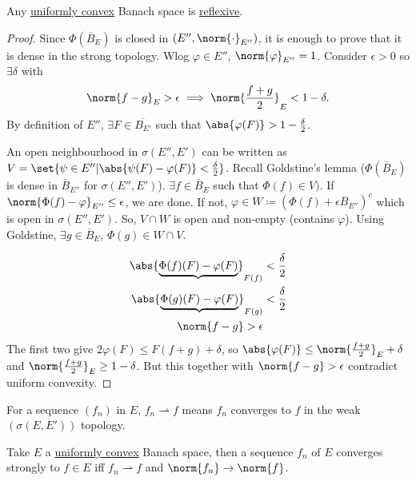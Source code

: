 \documentclass[twoside]{article}
\begin{document}
\begin{thm}
    Any \hyperlink{def:uc}{uniformly convex} Banach space is \hyperlink{def:reflexive}{reflexive}.
\end{thm}
\begin{proof}
    Since $\Phi(\overline{B}_E)$ is closed in $(E'', \norm{\cdot}_{E''})$, it is enough to prove that it is dense in the strong topology.
    Wlog $\varphi \in E''$, $\norm{\varphi}_{E''} = 1$. Consider $\epsilon > 0$ so $\exists \delta$ with
    \begin{equation*}
        \norm{f - g}_E > \epsilon \implies \norm{\frac{f+g}{2}}_E < 1 - \delta.
    \end{equation*}
    By definition of $E''$, $\exists F \in \overline{B_{E'}}$ such that $\abs{\varphi(F)} > 1 - \frac{\delta}{2}$.

    An open neighbourhood in $\sigma(E'', E')$ can be written as $V = \set{\psi \in E'' | \abs{\psi(F) - \varphi(F)} < \frac{\delta}{2}}$.
    Recall Goldstine's lemma ($\Phi(\overline{B}_E)$ is dense in $\overline{B}_{E''}$ for $\sigma(E'', E')$).
    $\exists f \in \overline{B}_E$ such that $\Phi(f) \in V)$. If $\norm{\Phi(f) - \varphi}_{E''} \leq \epsilon$, we are done.
    If not, $\varphi \in W \coloneqq (\Phi(f) + \epsilon \overline{B}_{E''})^c$ which is open in $\sigma(E'', E')$.
    So, $V \cap W$ is open and non-empty (contains $\varphi$). Using Goldstine, $\exists g \in \overline{B}_E$, $\Phi(g) \in W \cap V$.

    \begin{align*}
        \abs{\underbrace{\Phi(f)(F) - \varphi(F)}}_{F(f)} &< \frac{\delta}{2} \\
        \abs{\underbrace{\Phi(g)(F) - \varphi(F)}}_{F(g)} &< \frac{\delta}{2} \\
        \norm{f-g} > \epsilon
    \end{align*}
    The first two give $2 \varphi(F) \leq F(f+g) + \delta$, so $\abs{\varphi(F)} \leq \norm{\frac{f+g}{2}}_E + \delta$ and $\norm{\frac{f+g}{2}}_E \geq 1 - \delta$.
    But this together with $\norm{f-g} > \epsilon$ contradict uniform convexity.
\end{proof}
\begin{notation}
    For a sequence $(f_n)$ in $E$, $f_n \rightharpoonup f$ means $f_n$ converges to $f$ in the weak $(\sigma(E, E'))$ topology.
\end{notation}
\begin{prop}
    Take $E$ a \hyperlink{def:uc}{uniformly convex} Banach space, then a sequence $f_n$ of $E$ converges strongly to $f \in E$ iff $f_n \rightharpoonup f$ and $\norm{f_n} \to \norm{f}$.
\end{prop}
\end{document}
